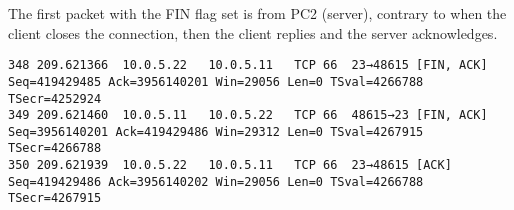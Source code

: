 The first packet with the FIN flag set is from PC2 (server), contrary to when the client closes the connection, then the client replies and the server acknowledges.

\begin{lstlisting}
348	209.621366	10.0.5.22	10.0.5.11	TCP	66	23→48615 [FIN, ACK] Seq=419429485 Ack=3956140201 Win=29056 Len=0 TSval=4266788 TSecr=4252924
349	209.621460	10.0.5.11	10.0.5.22	TCP	66	48615→23 [FIN, ACK] Seq=3956140201 Ack=419429486 Win=29312 Len=0 TSval=4267915 TSecr=4266788
350	209.621939	10.0.5.22	10.0.5.11	TCP	66	23→48615 [ACK] Seq=419429486 Ack=3956140202 Win=29056 Len=0 TSval=4266788 TSecr=4267915
\end{lstlisting}

